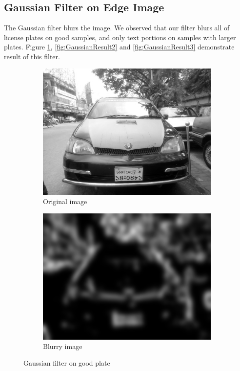 \subsection{Gaussian Filter on Edge Image}
The Gaussian filter blurs the image. We observed that our filter blurs all of license plates on good samples, and only text portions on samples with larger plates. Figure \ref{fig:GaussianResult1}, \ref{fig:GaussianResult2} and \ref{fig:GaussianResult3} demonstrate result of this filter.

\begin{figure}
\begin{subfigure}{0.5\textwidth}
    \centering
    \includegraphics[width=0.9\linewidth]{./img/experiment/stage.2/good3}
    \caption{Original image}
\end{subfigure}
\begin{subfigure}{0.5\textwidth}
    \centering
    \includegraphics[width=0.9\linewidth]{./img/experiment/stage.4/good3}
    \caption{Blurry image}
\end{subfigure}
\caption{Gaussian filter on good plate}
\label{fig:GaussianResult1}
\end{figure}

